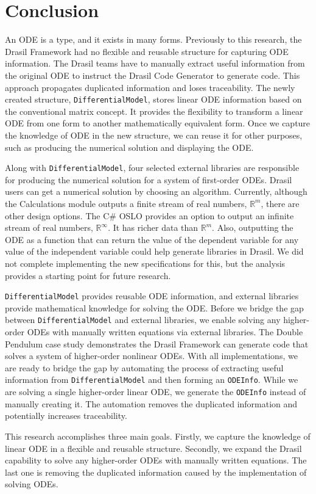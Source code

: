 \chapter{Conclusion}
An ODE is a type, and it exists in many forms. Previously to this research, the Drasil Framework had no flexible and reusable structure for capturing ODE information. The Drasil teams have to manually extract useful information from the original ODE to instruct the Drasil Code Generator to generate code. This approach propagates duplicated information and loses traceability. The newly created structure, \verb|DifferentialModel|, stores linear ODE information based on the conventional matrix concept. It provides the flexibility to transform a linear ODE from one form to another mathematically equivalent form. Once we capture the knowledge of ODE in the new structure, we can reuse it for other purposes, such as producing the numerical solution and displaying the ODE.

Along with \verb|DifferentialModel|, four selected external libraries are responsible for producing the numerical solution for a system of first-order ODEs. Drasil users can get a numerical solution by choosing an algorithm. Currently, although the Calculations module outputs a finite stream of real numbers, $\mathbb{R}^m$, there are other design options. The C\# OSLO provides an option to output an infinite stream of real numbers, $\mathbb{R}^{\infty}$. It has richer data than $\mathbb{R}^m$. Also, outputting the ODE as a function that can return the value of the dependent variable for any value of the independent variable could help generate libraries in Drasil. We did not complete implementing the new specifications for this, but the analysis provides a starting point for future research.

\verb|DifferentialModel| provides reusable ODE information, and external libraries provide mathematical knowledge for solving the ODE. Before we bridge the gap between \verb|DifferentialModel| and external libraries, we enable solving any higher-order ODEs with manually written equations via external libraries. The Double Pendulum case study demonstrates the Drasil Framework can generate code that solves a system of higher-order nonlinear ODEs. With all implementations, we are ready to bridge the gap by automating the process of extracting useful information from \verb|DifferentialModel| and then forming an \verb|ODEInfo|. While we are solving a single higher-order linear ODE, we generate the \verb|ODEInfo| instead of manually creating it. The automation removes the duplicated information and potentially increases traceability.

This research accomplishes three main goals. Firstly, we capture the knowledge of linear ODE in a flexible and reusable structure. Secondly, we expand the Drasil capability to solve any higher-order ODEs with manually written equations. The last one is removing the duplicated information caused by the implementation of solving ODEs.
